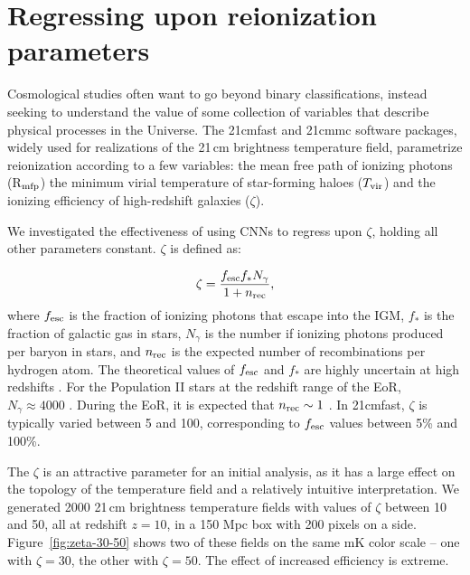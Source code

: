 \section{Regressing upon reionization parameters}

Cosmological studies often want to go beyond binary classifications, instead seeking to understand the value of some collection of variables that describe physical processes in the Universe. 
The {\sc 21cmfast} \citep{Mesinger.11} and {\sc 21cmmc} \citep{Greig.15} software packages, widely used for realizations of the 21\,cm brightness temperature field, parametrize reionization according to a few variables: the mean free path of ionizing photons (R$_{\rm mfp}$) the minimum virial temperature of star-forming haloes ($T_{\rm vir}$) and the ionizing efficiency of high-redshift galaxies ($\zeta$). 

We investigated the effectiveness of using CNNs to regress upon $\zeta$, holding all other parameters constant. $\zeta$ is defined as:

\begin{equation}
\zeta =  \frac{f_{\rm esc} f_* N_{\gamma}}{1+n_{\rm rec}},
\end{equation}
where $f_{\rm esc}$ is the fraction of ionizing photons that escape into the IGM, $f_*$ is the fraction of galactic gas in stars, $N_{\gamma}$ is the number if ionizing photons produced per baryon in stars, and $n_{\rm rec}$ is the expected number of recombinations per hydrogen atom. The theoretical values of $f_{\rm esc}$ and $f_*$ are highly uncertain at high redshifts \citep[e.g.][]{Paardekooper.15, Meiksin.17}. For the Population II stars at the redshift range of the EoR, $N_{\gamma}\approx4000$ \citep{Barkana.05}. During the EoR, it is expected that $n_{\rm rec}\sim 1$ \citep[e.g.][]{McQuinn.11, Sobacchi.14}. In {\sc 21cmfast}, $\zeta$ is typically varied between 5 and 100, corresponding to $f_{\rm esc}$ values between 5\% and 100\%.

The $\zeta$ is an attractive parameter for an initial analysis, as it has a large effect on the topology of the temperature field and a relatively intuitive interpretation. We generated 2000 21\,cm brightness temperature fields with values of $\zeta$ between 10 and 50, all at redshift $z=10$, in a 150 Mpc box with 200 pixels on a side. Figure~\ref{fig:zeta-30-50} shows two of these fields on the same mK color scale -- one with $\zeta=30$, the other with $\zeta=50$. The effect of increased efficiency is extreme.

